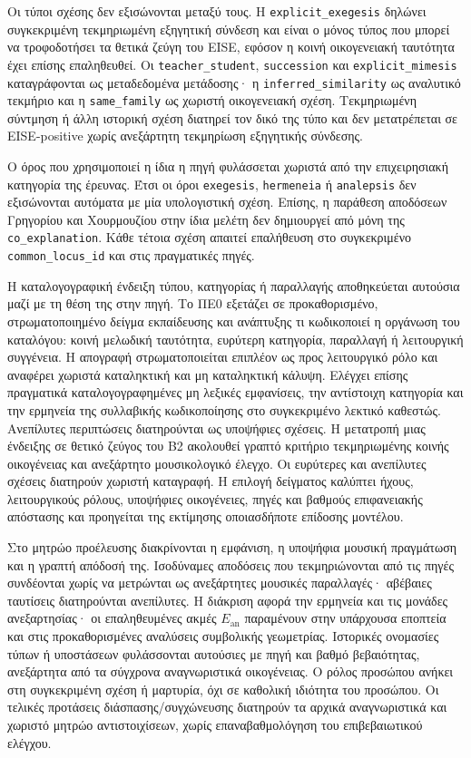 \documentclass[11pt,a4paper]{article}
\begin{document}
Οι τύποι σχέσης δεν εξισώνονται μεταξύ τους. Η \texttt{explicit\_exegesis} δηλώνει συγκεκριμένη τεκμηριωμένη εξηγητική σύνδεση και είναι ο μόνος τύπος που μπορεί να τροφοδοτήσει τα θετικά ζεύγη του EISE, εφόσον η κοινή οικογενειακή ταυτότητα έχει επίσης επαληθευθεί. Οι \texttt{teacher\_student}, \texttt{succession} και \texttt{explicit\_mimesis} καταγράφονται ως μεταδεδομένα μετάδοσης· η \texttt{inferred\_similarity} ως αναλυτικό τεκμήριο και η \texttt{same\_family} ως χωριστή οικογενειακή σχέση. Τεκμηριωμένη σύντμηση ή άλλη ιστορική σχέση διατηρεί τον δικό της τύπο και δεν μετατρέπεται σε EISE-positive χωρίς ανεξάρτητη τεκμηρίωση εξηγητικής σύνδεσης.

Ο όρος που χρησιμοποιεί η ίδια η πηγή φυλάσσεται χωριστά από την επιχειρησιακή κατηγορία της έρευνας. Έτσι οι όροι \texttt{exegesis}, \texttt{hermeneia} ή \texttt{analepsis} δεν εξισώνονται αυτόματα με μία υπολογιστική σχέση. Επίσης, η παράθεση αποδόσεων Γρηγορίου και Χουρμουζίου στην ίδια μελέτη δεν δημιουργεί από μόνη της \texttt{co\_explanation}. Κάθε τέτοια σχέση απαιτεί επαλήθευση στο συγκεκριμένο \texttt{common\_locus\_id} και στις πραγματικές πηγές.

Η καταλογογραφική ένδειξη τύπου, κατηγορίας ή παραλλαγής αποθηκεύεται αυτούσια μαζί με τη θέση της στην πηγή. Το ΠΕ0 εξετάζει σε προκαθορισμένο, στρωματοποιημένο δείγμα εκπαίδευσης και ανάπτυξης τι κωδικοποιεί η οργάνωση του καταλόγου: κοινή μελωδική ταυτότητα, ευρύτερη κατηγορία, παραλλαγή ή λειτουργική συγγένεια. Η απογραφή στρωματοποιείται επιπλέον ως προς λειτουργικό ρόλο και αναφέρει χωριστά καταληκτική και μη καταληκτική κάλυψη. Ελέγχει επίσης πραγματικά καταλογογραφημένες μη λεξικές εμφανίσεις, την αντίστοιχη κατηγορία και την ερμηνεία της συλλαβικής κωδικοποίησης στο συγκεκριμένο λεκτικό καθεστώς. Ανεπίλυτες περιπτώσεις διατηρούνται ως υποψήφιες σχέσεις. Η μετατροπή μιας ένδειξης σε θετικό ζεύγος του B2 ακολουθεί γραπτό κριτήριο τεκμηριωμένης κοινής οικογένειας και ανεξάρτητο μουσικολογικό έλεγχο. Οι ευρύτερες και ανεπίλυτες σχέσεις διατηρούν χωριστή καταγραφή. Η επιλογή δείγματος καλύπτει ήχους, λειτουργικούς ρόλους, υποψήφιες οικογένειες, πηγές και βαθμούς επιφανειακής απόστασης και προηγείται της εκτίμησης οποιασδήποτε επίδοσης μοντέλου.

Στο μητρώο προέλευσης διακρίνονται η εμφάνιση, η υποψήφια μουσική πραγμάτωση και η γραπτή απόδοσή της. Ισοδύναμες αποδόσεις που τεκμηριώνονται από τις πηγές συνδέονται χωρίς να μετρώνται ως ανεξάρτητες μουσικές παραλλαγές· αβέβαιες ταυτίσεις διατηρούνται ανεπίλυτες. Η διάκριση αφορά την ερμηνεία και τις μονάδες ανεξαρτησίας· οι επαληθευμένες ακμές $E_{\mathrm{an}}$ παραμένουν στην υπάρχουσα εποπτεία και στις προκαθορισμένες αναλύσεις συμβολικής γεωμετρίας. Ιστορικές ονομασίες τύπων ή υποστάσεων φυλάσσονται αυτούσιες με πηγή και βαθμό βεβαιότητας, ανεξάρτητα από τα σύγχρονα αναγνωριστικά οικογένειας. Ο ρόλος προσώπου ανήκει στη συγκεκριμένη σχέση ή μαρτυρία, όχι σε καθολική ιδιότητα του προσώπου. Οι τελικές προτάσεις διάσπασης/συγχώνευσης διατηρούν τα αρχικά αναγνωριστικά και χωριστό μητρώο αντιστοιχίσεων, χωρίς επαναβαθμολόγηση του επιβεβαιωτικού ελέγχου.
\end{document}
